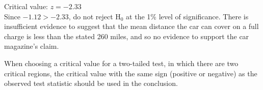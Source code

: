 \documentclass[
  11pt,
]{book}
\begin{document}
\begin{tcolorbox}[title=Example,colback=RoyalBlue!1!,colframe=RoyalBlue]
\vspace{0.2cm}

Critical value: $z=-\text{2.33}$\\

Since $-\text{1.12}>-\text{2.33}$, do not reject $\text{H}_\text{0}$ at the 1\% level of significance. There is insufficient evidence to suggest that the mean distance the car can cover on a full charge is less than the stated 260 miles, and so no evidence to support the car magazine's claim.

\end{tcolorbox}

When choosing a critical value for a two-tailed test, in which there are two critical regions, the critical value with the same sign (positive or negative) as the observed test statistic should be used in the conclusion.
\end{document}
